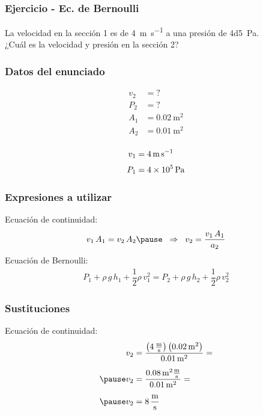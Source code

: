 \documentclass[14pt]{beamer}
\begin{document}
\begin{frame}
\frametitle{Ejercicio - Ec. de Bernoulli}
La velocidad en la sección 1 es de \SI[per-mode=symbol]{4}{\meter\per\second} a una presión de \SI{4d5}{\pascal}.
\\
\bigskip
\pause
¿Cuál es la velocidad y presión en la sección 2?
\end{frame}
\begin{frame}
\frametitle{Datos del enunciado}
\begin{minipage}{0.4\linewidth}
\begin{align*}
v_{2} &= ? \\[0.25em]
P_{2} &= ? \\[0.25em]
A_{1} &= \SI{0.02}{\square\meter} \\[0.25em]
A_{2} &= \SI{0.01}{\square\meter} \\[0.25em]
\end{align*}
\end{minipage}
\begin{minipage}{0.4\linewidth}
\begin{align*}
v_{1} &= \SI{4}{\meter\per\second} \\[0.25em]
P_{1} &= \SI{4d5}{\pascal}
\end{align*}
\end{minipage}
\end{frame}
\begin{frame}
\frametitle{Expresiones a utilizar}
Ecuación de continuidad:
\pause
\begin{eqnarray*}
\begin{aligned}
v_{1} \, A_{1} = v_{2} \, A_{2} \pause \hspace*{0.2cm} \Rightarrow \hspace*{0.2cm} v_{2} = \dfrac{v_{1} \, A_{1}}{a_{2}}
\end{aligned}
\end{eqnarray*}
\pause
Ecuación de Bernoulli:
\pause
\begin{align*}
P_{1} + \rho \, g \, h_{1} + \dfrac{1}{2} \rho \, v_{1}^{2} = P_{2} + \rho \, g \, h_{2} + \dfrac{1}{2} \rho \, v_{2}^{2}
\end{align*}
\end{frame}
\begin{frame}
\frametitle{Sustituciones}
Ecuación de continuidad:
\pause
\begin{eqnarray*}
\begin{aligned}
v_{2} &= \dfrac{\left(\SI[per-mode=fraction]{4}{\meter\per\second}\right) \left( \SI{0.02}{\square\meter}\right)}{\SI{0.01}{\square\meter}} = \\[0.5em] \pause
v_{2} &= \dfrac{\SI{0.08}{\square\meter} \unit[per-mode=fraction]{\meter\per\second}}{\SI{0.01}{\square\meter}} =  \\[0.5em] \pause
v_{2} &= \SI[per-mode=fraction]{8}{\meter\per\second}
\end{aligned}
\end{eqnarray*}
\end{frame}
\end{document}
